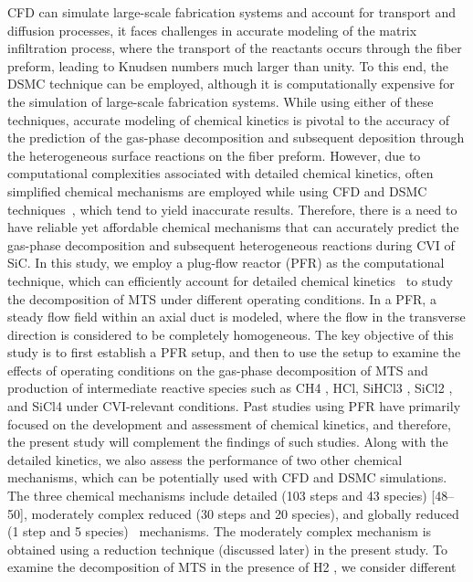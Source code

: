 \documentclass[final, letterpaper, square, comma, numbers, sort&compress]{elsarticle}
\begin{document}
CFD can simulate large-scale fabrication systems and account for transport and diffusion processes, it faces
challenges in accurate modeling of the matrix infiltration process, where the transport of the reactants
occurs through the fiber preform, leading to Knudsen numbers much larger than unity. To this end, the
DSMC technique can be employed, although it is computationally expensive for the simulation of large-scale
fabrication systems. While using either of these techniques, accurate modeling of chemical kinetics is pivotal
to the accuracy of the prediction of the gas-phase decomposition and subsequent deposition through the
heterogeneous surface reactions on the fiber preform. However, due to computational complexities associated
with detailed chemical kinetics, often simplified chemical mechanisms are employed while using CFD and
DSMC techniques~\cite{Deck2012,Mollick2017,Ogawa2023}, which tend to yield inaccurate results. Therefore, there is a need to have
reliable yet affordable chemical mechanisms that can accurately predict the gas-phase decomposition and
subsequent heterogeneous reactions during CVI of SiC. In this study, we employ a plug-flow reactor (PFR)
as the computational technique, which can efficiently account for detailed chemical kinetics~\cite{Papasouliotis1994,Roman1995,Bammidipati1996,Norinaga2008} to study
the decomposition of MTS under different operating conditions. In a PFR, a steady flow field within an axial
duct is modeled, where the flow in the transverse direction is considered to be completely homogeneous.
The key objective of this study is to first establish a PFR setup, and then to use the setup to examine
the effects of operating conditions on the gas-phase decomposition of MTS and production of intermediate
reactive species such as CH4 , HCl, SiHCl3 , SiCl2 , and SiCl4 under CVI-relevant conditions. Past studies
using PFR have primarily focused on the development and assessment of chemical kinetics, and therefore,
the present study will complement the findings of such studies. Along with the detailed kinetics, we also
assess the performance of two other chemical mechanisms, which can be potentially used with CFD and
DSMC simulations. The three chemical mechanisms include detailed (103 steps and 43 species) [48–50],
moderately complex reduced (30 steps and 20 species), and globally reduced (1 step and 5 species)~\cite{Mousavipour2004}
mechanisms. The moderately complex mechanism is obtained using a reduction technique (discussed later)
in the present study. To examine the decomposition of MTS in the presence of H2 , we consider different
\end{document}
